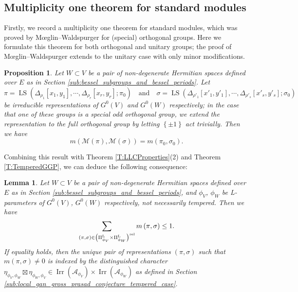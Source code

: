 \documentclass[11pt,letterpaper]{amsart}
\theoremstyle{plain}
\newcounter{theorem}[section]
\numberwithin{theorem}{section}
\numberwithin{equation}{subsection}
\newtheorem{Prop}[theorem]{Proposition}
\newtheorem{Lem}[theorem]{Lemma}
\theoremstyle{remark}
\newcommand{\Irr}{\operatorname{Irr}}
\newcommand{\LS}{\operatorname{LS}} %
\def\calA{\mathcal{A}}
\def\calM{\mathcal{M}}
\def\LP{\Pi^{\rm L}} %
\def\rel{{\rm rel}} %
\begin{document}
\subsection{Multiplicity one theorem for standard modules}

Firstly, we record a multiplicity one theorem for standard modules, which was proved by M{\oe}glin--Waldspurger \cite[Sect. 1.3]{MR3155346} for (special) orthogonal groups. Here we formulate this theorem for both orthogonal and unitary groups; the proof of M{\oe}glin--Waldspurger extends to the unitary case with only minor modifications.

\begin{Prop}\label{mwprop13}
Let $W\subset V$ be a pair of non-degenerate Hermitian spaces defined over $E$ as in Section \ref{sub:bessel_subgroups_and_bessel_periods}. Let
\[
    \pi=\LS\left(\Delta_{\rho_1}[x_1,y_1],\cdots,\Delta_{\rho_r}[x_r,y_r];\pi_0\right) \quad \text{and} \quad \sigma=\LS(\Delta_{\rho'_1}[x'_1,y'_1],\cdots,\Delta_{\rho'_s}[x'_s,y'_s];\sigma_0)
\]
be irreducible representations of $G^0\left(V\right)$ and $G^0\left(W\right)$ respectively; in the case that one of these groups is a special odd orthogonal group, we extend the representation to the full orthogonal group by letting $\left\{\pm1\right\}$ act trivially. Then we have
\[
    m\left(\calM\left(\pi\right),\calM\left(\sigma\right)\right) = m\left(\pi_0,\sigma_0\right).
\]
\end{Prop}

Combining this result with Theorem \ref{T:LLCProperties}(2) and Theorem \ref{T:TemperedGGP}, we can deduce the following consequence:

\begin{Lem}\label{focuslemma}
Let $W\subset V$ be a pair of non-degenerate Hermitian spaces defined over $E$ as in Section \ref{sub:bessel_subgroups_and_bessel_periods}, and $\phi_V$, $\phi_W$ be L-parameters of $G^0\left(V\right)$, $G^0\left(W\right)$ respectively, not necessarily tempered. Then we have
\[
    \sum_{\left(\pi,\sigma\right)\in \left(\LP_{\phi_{V}}\times \LP_{\phi_{W}}\right)^{\rel}}m\left(\pi,\sigma\right)\leq 1.
\]
If equality holds, then the unique pair of representations $\left(\pi,\sigma\right)$ such that $m\left(\pi,\sigma\right)\neq 0$ is indexed by the distinguished character $\eta_{\phi_V,\phi_W}\boxtimes\eta_{\phi_W,\phi_V}\in\Irr\left(\calA_{\phi_V}\right)\times\Irr\left(\calA_{\phi_W}\right)$ as defined in Section \ref{sub:local_gan_gross_prasad_conjecture_tempered_case}.
\end{Lem}
\end{document}
